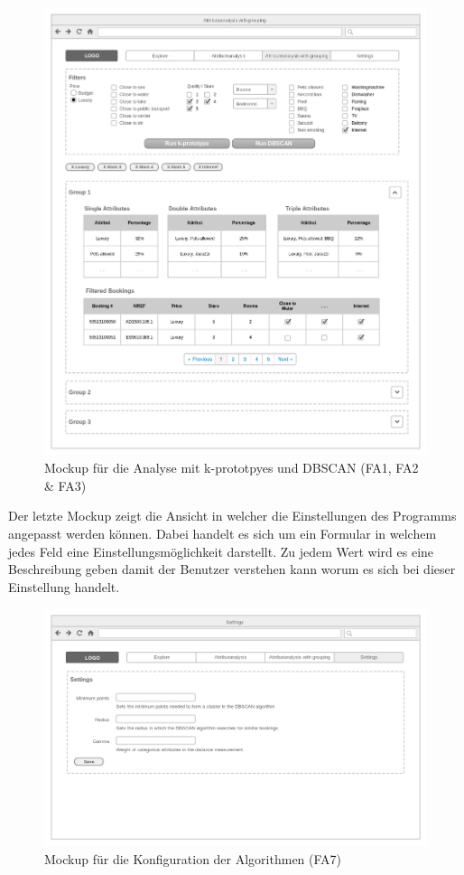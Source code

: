 \begin{figure}[H]
	\RawFloats
	\centering
	\includegraphics[width=1\textwidth]{images/wireframe-clustering}
	\caption{Mockup für die Analyse mit k-prototpyes und DBSCAN (FA1, FA2 \& FA3)}
	\label{fig:konzept:mockups:clustering}
\end{figure}

Der letzte Mockup zeigt die Ansicht in welcher die Einstellungen des Programms angepasst werden können. Dabei handelt es sich um ein Formular in welchem jedes Feld eine Einstellungsmöglichkeit darstellt. Zu jedem Wert wird es eine Beschreibung geben damit der Benutzer verstehen kann worum es sich bei dieser Einstellung handelt.

\begin{figure}[H]
	\RawFloats
	\centering
	\includegraphics[width=1\textwidth]{images/wireframe-settings}
	\caption{Mockup für die Konfiguration der Algorithmen (FA7)}
	\label{fig:konzept:mockups:settings}
\end{figure}

